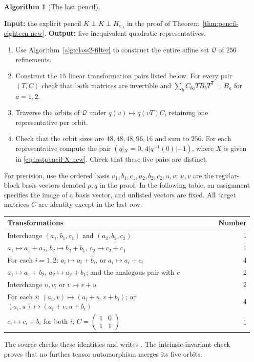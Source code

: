 \documentclass[11pt,a4paper]{amsart}
\theoremstyle{definition}
\newtheorem{algorithm}{Algorithm}
\theoremstyle{remark}
\numberwithin{equation}{section}
\begin{document}
\par\noindent\begin{minipage}{\linewidth}
\begin{algorithm}[The last pencil]\label{alg:last-pencil}
\leavevmode\par
\textbf{Input:} the explicit pencil $K\perp K\perp H_{w_1}$ in the
proof of Theorem~\ref{thm:pencil-eighteen-new}.
\textbf{Output:} five inequivalent quadratic representatives.
\begin{enumerate}
\item Use Algorithm~\ref{alg:class2-filter} to construct the entire
affine set $\mathcal Q$ of $256$ refinements.
\item Construct the $15$ linear transformation pairs listed below.
For every pair $(T,C)$ check that both matrices are invertible and
$\sum_b C_{ba}TB_bT^{\mathsf T}=B_a$ for $a=1,2$.
\item Traverse the orbits of $\mathcal Q$ under
$q(v)\mapsto q(vT)C$, retaining one representative per orbit.
\item Check that the orbit sizes are $48,48,48,96,16$ and sum to
$256$. For each representative compute the pair
$(q|_X=0,\,4|q^{-1}(0)|-1)$, where $X$ is given in
\eqref{eq:lastpencil-X-new}. Check that these five pairs are distinct.
\end{enumerate}
\end{algorithm}
\end{minipage}\par\medskip
For precision, use the ordered basis $a_1,b_1,c_1,a_2,b_2,c_2,u,v$;
$u,v$ are the regular-block basis vectors denoted $p,q$ in the proof.
In the following table, an assignment specifies the image of a basis
vector, and unlisted vectors are fixed. All target matrices $C$ are
identity except in the last row.
\begin{center}\small
\begin{tabular}{@{}p{.83\linewidth}r@{}}\toprule
Transformations & Number\\\midrule
Interchange $(a_1,b_1,c_1)$ and $(a_2,b_2,c_2)$ &1\\
$a_1\mapsto a_1+a_2$, $b_2\mapsto b_2+b_1$, $c_2\mapsto c_2+c_1$ &1\\
For each $i=1,2$: $a_i\mapsto a_i+b_i$, or $a_i\mapsto a_i+c_i$ &4\\
$a_1\mapsto a_1+b_2$, $a_2\mapsto a_2+b_1$; and the analogous pair with $c$ &2\\
Interchange $u,v$; or $v\mapsto v+u$ &2\\
For each $i$: $(a_i,v)\mapsto(a_i+u,v+b_i)$; or $(a_i,u)\mapsto(a_i+v,u+b_i)$ &4\\
$c_i\mapsto c_i+b_i$ for both $i$; $C=\left(\begin{smallmatrix}1&0\\1&1\end{smallmatrix}\right)$ &1\\\bottomrule
\end{tabular}
\end{center}
The source  checks these identities
and writes . The intrinsic-invariant
check proves that no further tensor automorphism merges its five orbits.
\end{document}
